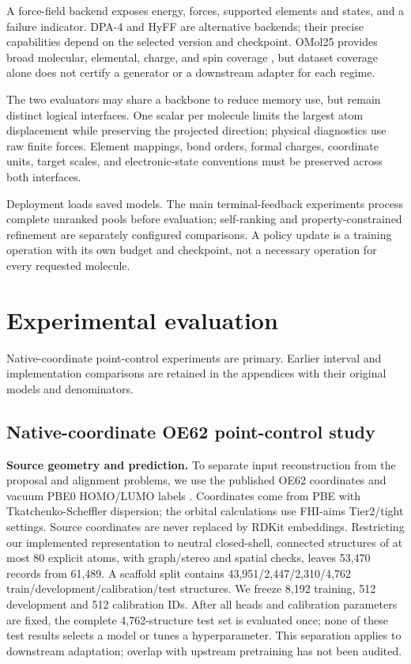 \documentclass[11pt,a4paper]{article}
\begin{document}
A force-field backend exposes energy, forces, supported elements and
states, and a failure indicator. DPA-4 \citep{deepmodeling2026dpa4} and
HyFF \citep{hyra2026hyff} are alternative backends; their precise
capabilities depend on the selected version and checkpoint. OMol25
provides broad molecular, elemental, charge, and spin coverage
\citep{levine2025omol25}, but dataset coverage alone does not certify a
generator or a downstream adapter for each regime.

The two evaluators may share a backbone to reduce memory use, but remain
distinct logical interfaces. One scalar per molecule limits the largest
atom displacement while preserving the projected direction; physical
diagnostics use raw finite forces. Element mappings, bond orders, formal
charges, coordinate units, target scales, and electronic-state
conventions must be preserved across both interfaces.

Deployment loads saved models. The main terminal-feedback experiments
process complete unranked pools before evaluation; self-ranking and
property-constrained refinement are separately configured comparisons. A
policy update is a training operation with its own budget and
checkpoint, not a necessary operation for every requested molecule.

\section{Experimental evaluation}\label{experimental-evaluation}

Native-coordinate point-control experiments are primary. Earlier
interval and implementation comparisons are retained in the appendices
with their original models and denominators.

\FloatBarrier
\subsection{Native-coordinate OE62 point-control
study}\label{native-coordinate-oe62-point-control-study}

\textbf{Source geometry and prediction.} To separate input
reconstruction from the proposal and alignment problems, we use the
published OE62 coordinates and vacuum PBE0 HOMO/LUMO labels
\citep{stuke2020oe62}. Coordinates come from PBE with
Tkatchenko-Scheffler dispersion; the orbital calculations use FHI-aims
Tier2/tight settings. Source coordinates are never replaced by RDKit
embeddings. Restricting our implemented representation to neutral
closed-shell, connected structures of at most 80 explicit atoms, with
graph/stereo and spatial checks, leaves 53,470 records from 61,489. A
scaffold split contains 43,951/2,447/2,310/4,762
train/development/calibration/test structures. We freeze 8,192 training,
512 development and 512 calibration IDs. After all heads and calibration
parameters are fixed, the complete 4,762-structure test set is evaluated
once; none of these test results selects a model or tunes a
hyperparameter. This separation applies to downstream adaptation;
overlap with upstream pretraining has not been audited.
\end{document}
